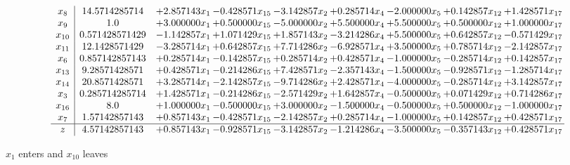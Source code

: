 \documentclass[10pt]{article}
\begin{document}
 \[\begin{array}{c| c c@{\hskip 2pt} c@{\hskip 2pt} c@{\hskip 2pt} c@{\hskip 2pt} c@{\hskip 2pt} c@{\hskip 2pt} c@{\hskip 2pt} }
 x_{8}   &  14.5714285714 & + 2.857143 x_{1} & -0.428571 x_{15} & -3.142857 x_{2} & + 0.285714 x_{4} & -2.000000 x_{5} & + 0.142857 x_{12} & + 1.428571 x_{17}\\
 x_{9}   &  1.0 & + 3.000000 x_{1} & + 0.500000 x_{15} & -5.000000 x_{2} & + 5.500000 x_{4} & + 5.500000 x_{5} & + 0.500000 x_{12} & + 1.000000 x_{17}\\
 x_{10}   &  0.571428571429 & -1.142857 x_{1} & + 1.071429 x_{15} & + 1.857143 x_{2} & -3.214286 x_{4} & + 5.500000 x_{5} & + 0.642857 x_{12} & -0.571429 x_{17}\\
 x_{11}   &  12.1428571429 & -3.285714 x_{1} & + 0.642857 x_{15} & + 7.714286 x_{2} & -6.928571 x_{4} & + 3.500000 x_{5} & + 0.785714 x_{12} & -2.142857 x_{17}\\
 x_{6}   &  0.857142857143 & + 0.285714 x_{1} & -0.142857 x_{15} & + 0.285714 x_{2} & + 0.428571 x_{4} & -1.000000 x_{5} & -0.285714 x_{12} & + 0.142857 x_{17}\\
 x_{13}   &  9.28571428571 & + 0.428571 x_{1} & -0.214286 x_{15} & + 7.428571 x_{2} & -2.357143 x_{4} & -1.500000 x_{5} & -0.928571 x_{12} & -1.285714 x_{17}\\
 x_{14}   &  20.8571428571 & + 3.285714 x_{1} & -2.142857 x_{15} & -9.714286 x_{2} & + 2.428571 x_{4} & -4.000000 x_{5} & -0.285714 x_{12} & + 3.142857 x_{17}\\
 x_{3}   &  0.285714285714 & + 1.428571 x_{1} & -0.214286 x_{15} & -2.571429 x_{2} & + 1.642857 x_{4} & -0.500000 x_{5} & + 0.071429 x_{12} & + 0.714286 x_{17}\\
 x_{16}   &  8.0 & + 1.000000 x_{1} & -0.500000 x_{15} & + 3.000000 x_{2} & -1.500000 x_{4} & -0.500000 x_{5} & + 0.500000 x_{12} & -1.000000 x_{17}\\
 x_{7}   &  1.57142857143 & + 0.857143 x_{1} & -0.428571 x_{15} & -2.142857 x_{2} & + 0.285714 x_{4} & -1.000000 x_{5} & + 0.142857 x_{12} & + 0.428571 x_{17}\\
\hline
z    &  4.57142857143 & + 0.857143 x_{1} & -0.928571 x_{15} & -3.142857 x_{2} & -1.214286 x_{4} & -3.500000 x_{5} & -0.357143 x_{12} & + 0.428571 x_{17}\\
\end{array}\]


 $ x_{1} $ enters and $ x_{10} $ leaves 
\end{document}
